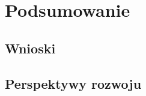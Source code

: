 
\chapter{Podsumowanie\label{chap:podsumowanie}}

\section{Wnioski}


\section{Perspektywy rozwoju}
